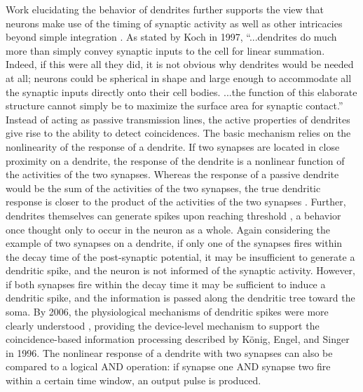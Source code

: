 Work elucidating the behavior of dendrites further supports the view that neurons make use of the timing of synaptic activity as well as other intricacies beyond simple integration \cite{stsp2015}. As stated by Koch in 1997, ``...dendrites do much more than simply convey synaptic inputs to the cell for linear summation. Indeed, if this were all they did, it is not obvious why dendrites would be needed at all; neurons could be spherical in shape and large enough to accommodate all the synaptic inputs directly onto their cell bodies. ...the function of this elaborate structure cannot simply be to maximize the surface area for synaptic contact.'' \cite{ko1997} Instead of acting as passive transmission lines, the active properties of dendrites \cite{joma1996} give rise to the ability to detect coincidences. The basic mechanism relies on the nonlinearity of the response of a dendrite. If two synapses are located in close proximity on a dendrite, the response of the dendrite is a nonlinear function of the activities of the two synapses. Whereas the response of a passive dendrite would be the sum of the activities of the two synapses, the true dendritic response is closer to the product of the activities of the two synapses \cite{ko1997}. Further, dendrites themselves can generate spikes upon reaching threshold \cite{hoko2006}, a behavior once thought only to occur in the neuron as a whole. Again considering the example of two synapses on a dendrite, if only one of the synapses fires within the decay time of the post-synaptic potential, it may be insufficient to generate a dendritic spike, and the neuron is not informed of the synaptic activity. However, if both synapses fire within the decay time it may be sufficient to induce a dendritic spike, and the information is passed along the dendritic tree toward the soma. By 2006, the physiological mechanisms of dendritic spikes were more clearly understood \cite{hoko2006}, providing the device-level mechanism to support the coincidence-based information processing described by K\"{o}nig, Engel, and Singer in 1996. The nonlinear response of a dendrite with two synapses can also be compared to a logical AND operation: if synapse one AND synapse two fire within a certain time window, an output pulse is produced. 

